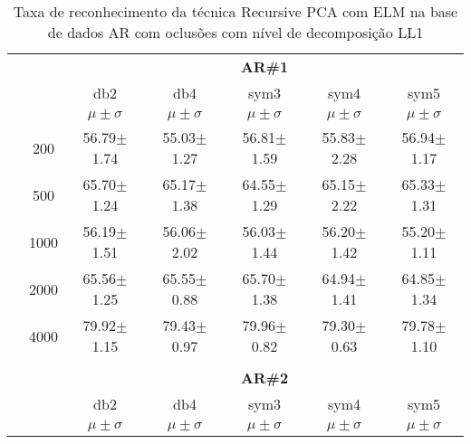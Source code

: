 \begin{table}[H]
	\centering
    \normalsize
	\caption{Taxa de reconhecimento da técnica Recursive PCA com ELM na base de dados AR com oclusões com nível de decomposição LL1}
   \hspace{0.5in}
	\begin{tabular}{|c|c|c c c c c|}
\cline{3-7}
\multicolumn{2}{c|}{\multirow{3}{*}{}} & \multicolumn{5}{c|}{\textbf{AR\#1}}   \\\cline{3-7} 
\multicolumn{2}{c|}{}  & db2 & db4 & sym3 & sym4 & sym5 \\\cline{3-7}%
\multicolumn{2}{c|}{}& $\mu \pm \sigma$ & $\mu \pm \sigma$ & $\mu \pm \sigma$ & $\mu \pm \sigma$ & $\mu \pm \sigma$ \\\hline


\multicolumn{1}{|c|}{ \multirow{5}{*}{\rotatebox[origin=c]{90}{\textbf{Neurônios}}} }
&200	&56.79$\pm$1.74	&55.03$\pm$1.27	&56.81$\pm$1.59	&55.83$\pm$2.28	&56.94$\pm$1.17\\\cline{2-7}
&500	&65.70$\pm$1.24	&65.17$\pm$1.38	&64.55$\pm$1.29	&65.15$\pm$2.22	&65.33$\pm$1.31\\\cline{2-7}
&1000	&56.19$\pm$1.51	&56.06$\pm$2.02 &56.03$\pm$1.44	&56.20$\pm$1.42	&55.20$\pm$1.11\\\cline{2-7}
&2000	&65.56$\pm$1.25	&65.55$\pm$0.88	&65.70$\pm$1.38	&64.94$\pm$1.41	&64.85$\pm$1.34\\\cline{2-7}
&4000	&79.92$\pm$1.15	&79.43$\pm$0.97	&79.96$\pm$0.82	&79.30$\pm$0.63	&79.78$\pm$1.10






\\\midrule%

\multicolumn{7}{c}{}\\ 

\cline{3-7}
\multicolumn{2}{c|}{\multirow{3}{*}{}} & \multicolumn{5}{c|}{\textbf{AR\#2}}   \\\cline{3-7} 

\multicolumn{2}{c|}{}  & db2 & db4 & sym3 & sym4 & sym5 \\\cline{3-7}
\multicolumn{2}{c|}{}& $\mu \pm \sigma$ & $\mu \pm \sigma$ & $\mu \pm \sigma$ & $\mu \pm \sigma$ & $\mu \pm \sigma$ \\\hline



\end{tabular}
\end{table}

